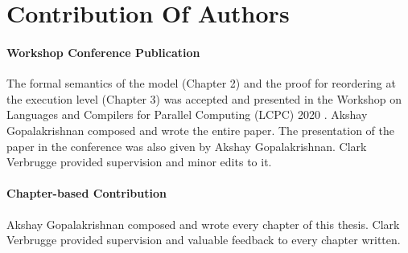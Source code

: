 



\section{Contribution Of Authors}

    \paragraph{Workshop Conference Publication}
        The formal semantics of the model (Chapter 2) and the proof for reordering at the execution level (Chapter 3) was accepted and presented in the Workshop on Languages and Compilers for Parallel Computing (LCPC) 2020 \cite{Akshay}. 
        Akshay Gopalakrishnan composed and wrote the entire paper.
        The presentation of the paper in the conference was also given by Akshay Gopalakrishnan.
        Clark Verbrugge provided supervision and minor edits to it.
        
    \paragraph{Chapter-based Contribution}

        Akshay Gopalakrishnan composed and wrote every chapter of this thesis.
        Clark Verbrugge provided supervision and valuable feedback to every chapter written.
        